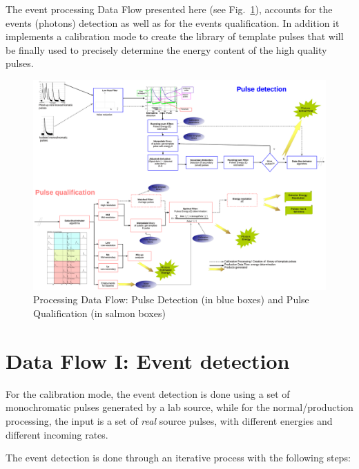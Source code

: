 \documentclass[11pt,twoside]{article}
\begin{document}
The event processing Data Flow presented here (see Fig.~\ref{dataflow}), accounts for the events (photons) 
detection \citep{ceballos_2012} as well as for the events qualification. In addition it implements a calibration mode to
create the library of template pulses that will be finally used to precisely determine the energy content of the high quality pulses.

\begin{figure}
\centering
\includegraphics[angle=90,width=1.25\textwidth]{P009_f1.eps} 
\caption{Processing Data Flow: Pulse Detection (in blue boxes) and Pulse Qualification (in salmon boxes)}
\label{dataflow}
\end{figure}

\section{Data Flow I: Event detection}
For the calibration mode, the event detection is done using a set of monochromatic pulses generated by a lab source, while for the 
normal/production processing, the input is a set of \textit{real} source pulses, with different energies and different incoming rates.

The event detection is done through an iterative process with the following steps:
\end{document}
